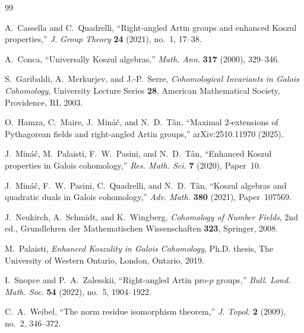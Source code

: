 \documentclass[12pt]{amsart}
\theoremstyle{plain}
\theoremstyle{definition}
\theoremstyle{remark}
\numberwithin{equation}{section}
\begin{document}
\begin{thebibliography}{99}

A.~Cassella and C.~Quadrelli,
``Right-angled Artin groups and enhanced Koszul properties,''
\textit{J. Group Theory} \textbf{24} (2021), no.~1, 17--38.

A.~Conca,
``Universally Koszul algebras,''
\textit{Math. Ann.} \textbf{317} (2000), 329--346.

S.~Garibaldi, A.~Merkurjev, and J.-P.~Serre,
\textit{Cohomological Invariants in Galois Cohomology},
University Lecture Series \textbf{28},
American Mathematical Society, Providence, RI, 2003.

O.~Hamza, C.~Maire, J.~Min\'{a}\v{c}, and N.~D.~T\^{a}n,
``Maximal \(2\)-extensions of Pythagorean fields and
right-angled Artin groups,''
arXiv:2510.11970 (2025).

J.~Min\'{a}\v{c}, M.~Palaisti, F.~W.~Pasini, and N.~D.~T\^{a}n,
``Enhanced Koszul properties in Galois cohomology,''
\textit{Res. Math. Sci.} \textbf{7} (2020), Paper~10.

J.~Min\'{a}\v{c}, F.~W.~Pasini, C.~Quadrelli, and N.~D.~T\^{a}n,
``Koszul algebras and quadratic duals in Galois cohomology,''
\textit{Adv. Math.} \textbf{380} (2021), Paper~107569.

J.~Neukirch, A.~Schmidt, and K.~Wingberg,
\textit{Cohomology of Number Fields},
2nd ed., Grundlehren der Mathematischen Wissenschaften
\textbf{323}, Springer, 2008.

M.~Palaisti,
\textit{Enhanced Koszulity in Galois Cohomology},
Ph.D. thesis, The University of Western Ontario, London, Ontario, 2019.

I.~Snopce and P.~A.~Zalesskii,
``Right-angled Artin pro-\(p\) groups,''
\textit{Bull. Lond. Math. Soc.} \textbf{54} (2022), no.~5,
1904--1922.

C.~A.~Weibel,
``The norm residue isomorphism theorem,''
\textit{J. Topol.} \textbf{2} (2009), no.~2, 346--372.

\end{thebibliography}
\end{document}
